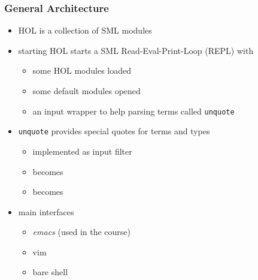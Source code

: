 \begin{frame}
\frametitle{General Architecture}
\begin{itemize}
\item HOL is a collection of SML modules
\item starting HOL starts a SML Read-Eval-Print-Loop (REPL) with
\begin{itemize}
\item some HOL modules loaded
\item some default modules opened
\item an input wrapper to help parsing terms called \texttt{unquote}
\end{itemize}
\item \texttt{unquote} provides special quotes for terms and types
\begin{itemize}
\item implemented as input filter
\item {} becomes 
\item {} becomes 
\end{itemize}
\item main interfaces
\begin{itemize}
\item \emph{emacs} (used in the course)
\item vim
\item bare shell
\end{itemize}
\end{itemize}
\end{frame}


